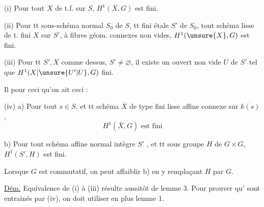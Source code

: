 (i) Pour tout $X$ de t.f. sur $S$, $H^1(X,G)$ est fini.

(ii) Pour tt sous-schéma  normal
$S_0$ de $S$,  tt  fini étale
$S'$ de $S_0$, tout schéma  lisse de t. fini $X$ sur $S'$, à fibres géom. connexes non vides, $H^1(\unsure{X},G)$ est fini.

(iii) Pour tt $S',X$ comme dessus, $S'\neq\varnothing$, il existe un ouvert non vide $U$ de $S'$ tel que $H^1(X|\unsure{U'|U},G)$  fini.

Il  pour ceci qu'on ait ceci :

(iv) a) Pour tout $s\in S$, et tt schéma $\bar X$ de type fini lisse affine connexe sur $\overline{k(s)}$,
\[
H^1(\bar X,G)\text{ est fini}
\]

b) Pour tout   schéma affine normal intègre $S'$ ,
et tt sous groupe $H$ de $G\times G$,
$H^1(S',H)$ est fini.

Lorsque $G$ est commutatif, on peut affaiblir b) en y remplaçant $H$ par $G$.


\uline{Dém.} Equivalence de (i) à (iii) résulte aussitôt de lemme 3. Pour prouver qu' sont entrainés par (iv), on doit utiliser en plus lemme 1.
